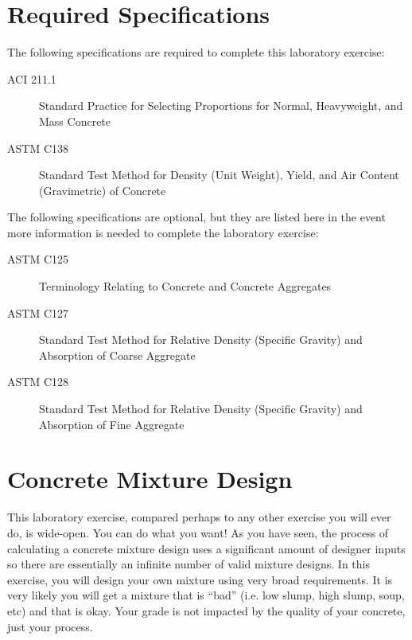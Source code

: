 \documentclass[12pt]{article}
\begin{document}
\section*{Required Specifications}
The following specifications are required to complete this laboratory exercise:
\begin{description}
\item[ACI 211.1] Standard Practice for Selecting Proportions for Normal, Heavyweight, and Mass Concrete
\item[ASTM C138] Standard Test Method for Density (Unit Weight), Yield, and Air Content (Gravimetric) of Concrete
\end{description}

The following specifications are optional, but they are listed here in the event more information is needed to complete the laboratory exercise:
\begin{description}
\item[ASTM C125] Terminology Relating to Concrete and Concrete Aggregates
\item[ASTM C127] Standard Test Method for Relative Density (Specific Gravity) and Absorption of Coarse Aggregate
\item[ASTM C128] Standard Test Method for Relative Density (Specific Gravity) and Absorption of Fine Aggregate
\end{description}
\pagebreak
\section{Concrete Mixture Design}
\label{sec:intro}
\normalsize 
This laboratory exercise, compared perhaps to any other exercise you will ever do, is wide-open. You can do what you want! As you have seen, the process of calculating a concrete mixture design uses a significant amount of designer inputs so there are essentially an infinite number of valid mixture designs. In this exercise, you will design your own mixture using very broad requirements. It is very likely you will get a mixture that is ``bad'' (i.e. low slump, high slump, soup, etc) and that is okay. Your grade is not impacted by the quality of your concrete, just your process.
\end{document}
